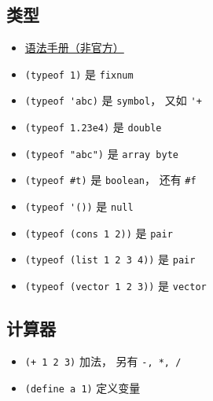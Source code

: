 
\subsection{类型}
\begin{itemize}
\item \href{https://code.google.com/archive/p/femtolisp/wikis/Manual.wiki}{语法手册（非官方）}
\item \verb`(typeof 1)` 是 \verb`fixnum`
\item \verb`(typeof 'abc)` 是 \verb`symbol`， 又如 \verb`'+`
\item \verb`(typeof 1.23e4)` 是 \verb`double`
\item \verb`(typeof "abc")` 是 \verb`array byte`
\item \verb`(typeof #t)` 是 \verb`boolean`， 还有 \verb`#f`
\item \verb`(typeof '())` 是 \verb`null`
\item \verb`(typeof (cons 1 2))` 是 \verb`pair`
\item \verb`(typeof (list 1 2 3 4))` 是 \verb`pair`
\item \verb`(typeof (vector 1 2 3))` 是 \verb`vector`
\end{itemize}

\subsection{计算器}
\begin{itemize}
\item \verb`(+ 1 2 3)` 加法， 另有 \verb`-, *, /`
\item \verb`(define a 1)` 定义变量
\end{itemize}
